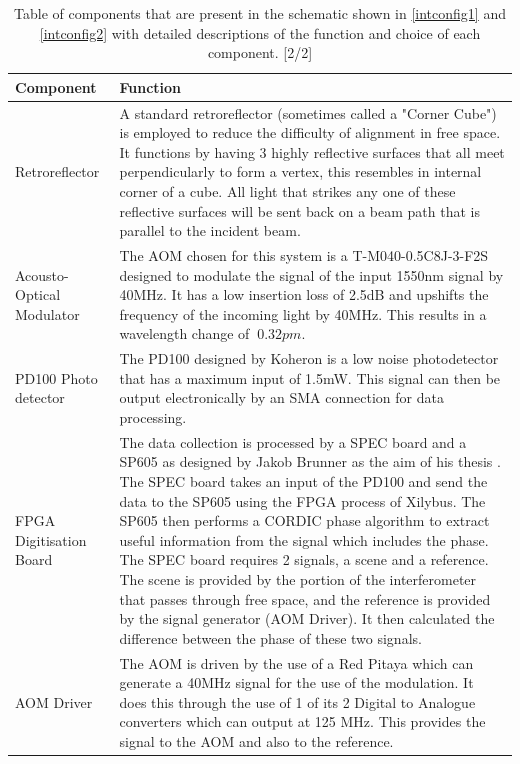 \documentclass[12pt,a4paper,oneside]{report}
\begin{document}
\begin{center}
\begin{table}[H]
	\setlength\arrayrulewidth{1pt}
    \begin{tabular}{|p{2.5cm}|p{12.6cm}|}
    	\hline
    	Component & Function\\
       	\hline
        Retroreflector & A standard retroreflector (sometimes called a "Corner Cube") is employed to reduce the difficulty of alignment in free space. It functions by having 3 highly reflective surfaces that all meet perpendicularly to form a vertex, this resembles in internal corner of a cube. All light that strikes any one of these reflective surfaces will be sent back on a beam path that is parallel to the incident beam. \\
        \hline
        Acousto-Optical Modulator & The AOM \cite{Sell1550MODULATORb} chosen for this system is a  T-M040-0.5C8J-3-F2S designed to modulate the signal of the input 1550nm signal by 40MHz. It has a low insertion loss of 2.5dB and upshifts the frequency of the incoming light by 40MHz. This results in a wavelength change of $~0.32pm$. \\
        \hline
        PD100 Photo detector & The PD100 designed by Koheron \cite{KoheronPD100Photodetector} is a low noise photodetector that has a maximum input of 1.5mW. This signal can then be output electronically by an SMA connection for data processing.\\
        \hline
        FPGA Digitisation Board & The data collection is processed by a SPEC board and a SP605 as designed by Jakob Brunner as the aim of his thesis \cite{Brunner2017}. The SPEC board takes an input of the PD100 and send the data to the SP605 using the FPGA process of Xilybus. The SP605 then performs a CORDIC phase algorithm to extract useful information from the signal which includes the phase. The SPEC board requires 2 signals, a scene and a reference. The scene is provided by the portion of the interferometer that passes through free space, and the reference is provided by the signal generator (AOM Driver). It then calculated the difference between the phase of these two signals.\\
        \hline
        AOM Driver & The AOM is driven by the use of a Red Pitaya \cite{Leban2014RedManual} which can generate a 40MHz signal for the use of the modulation. It does this through the use of 1 of its 2 Digital to Analogue converters which can output at 125 MHz. This provides the signal to the AOM and also to the reference.\\
        \hline
	\end{tabular}
    \caption{Table of components that are present in the schematic shown in  \autoref{intconfig1} and \autoref{intconfig2} with detailed descriptions of the function and choice of each component. [2/2]}
    \label{tbl:components2}
\end{table}
\end{center}
\end{document}
